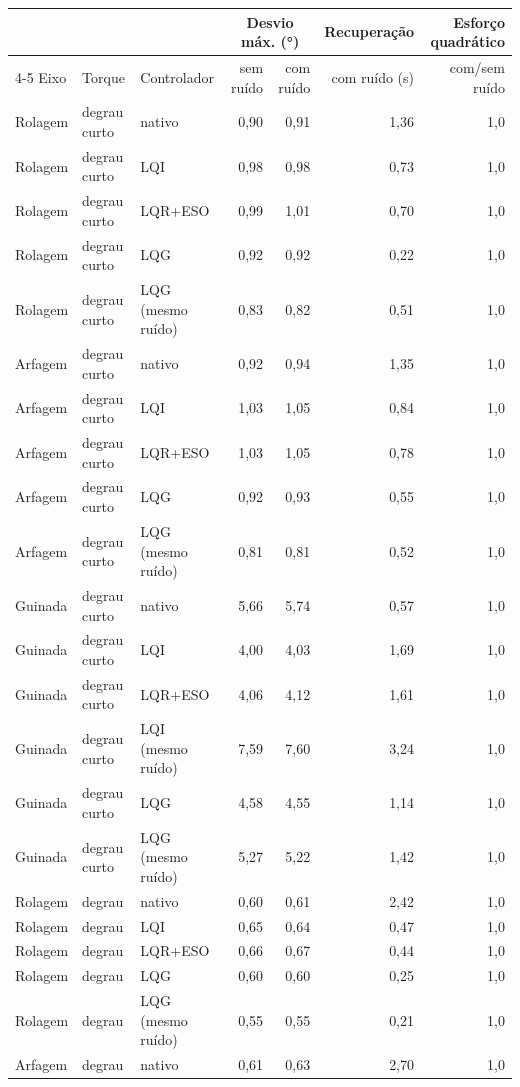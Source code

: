 \begin{tabular}{lllrrrr}
\toprule
 & & & \multicolumn{2}{c}{Desvio máx. (\si{\degree})} & Recuperação & Esforço quadrático \\
\cmidrule(lr){4-5}
Eixo & Torque & Controlador & sem ruído & com ruído & com ruído (\si{\second}) & com/sem ruído \\
\midrule
Rolagem & degrau curto & nativo & 0,90 & 0,91 & 1,36 & 1,0 \\
Rolagem & degrau curto & LQI & 0,98 & 0,98 & 0,73 & 1,0 \\
Rolagem & degrau curto & LQR+ESO & 0,99 & 1,01 & 0,70 & 1,0 \\
Rolagem & degrau curto & LQG & 0,92 & 0,92 & 0,22 & 1,0 \\
Rolagem & degrau curto & LQG (mesmo ruído) & 0,83 & 0,82 & 0,51 & 1,0 \\
Arfagem & degrau curto & nativo & 0,92 & 0,94 & 1,35 & 1,0 \\
Arfagem & degrau curto & LQI & 1,03 & 1,05 & 0,84 & 1,0 \\
Arfagem & degrau curto & LQR+ESO & 1,03 & 1,05 & 0,78 & 1,0 \\
Arfagem & degrau curto & LQG & 0,92 & 0,93 & 0,55 & 1,0 \\
Arfagem & degrau curto & LQG (mesmo ruído) & 0,81 & 0,81 & 0,52 & 1,0 \\
Guinada & degrau curto & nativo & 5,66 & 5,74 & 0,57 & 1,0 \\
Guinada & degrau curto & LQI & 4,00 & 4,03 & 1,69 & 1,0 \\
Guinada & degrau curto & LQR+ESO & 4,06 & 4,12 & 1,61 & 1,0 \\
Guinada & degrau curto & LQI (mesmo ruído) & 7,59 & 7,60 & 3,24 & 1,0 \\
Guinada & degrau curto & LQG & 4,58 & 4,55 & 1,14 & 1,0 \\
Guinada & degrau curto & LQG (mesmo ruído) & 5,27 & 5,22 & 1,42 & 1,0 \\
\addlinespace
Rolagem & degrau & nativo & 0,60 & 0,61 & 2,42 & 1,0 \\
Rolagem & degrau & LQI & 0,65 & 0,64 & 0,47 & 1,0 \\
Rolagem & degrau & LQR+ESO & 0,66 & 0,67 & 0,44 & 1,0 \\
Rolagem & degrau & LQG & 0,60 & 0,60 & 0,25 & 1,0 \\
Rolagem & degrau & LQG (mesmo ruído) & 0,55 & 0,55 & 0,21 & 1,0 \\
Arfagem & degrau & nativo & 0,61 & 0,63 & 2,70 & 1,0 \\

\end{tabular}
